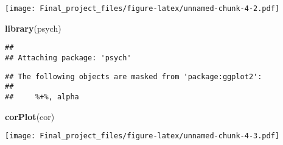 \documentclass[
]{article}
\newenvironment{Shaded}{\begin{snugshade}}{\end{snugshade}}
\newcommand{\CommentTok}[1]{\textcolor[rgb]{0.56,0.35,0.01}{\textit{#1}}}
\newcommand{\FunctionTok}[1]{\textcolor[rgb]{0.13,0.29,0.53}{\textbf{#1}}}
\newcommand{\NormalTok}[1]{#1}
\newcommand{\OtherTok}[1]{\textcolor[rgb]{0.56,0.35,0.01}{#1}}
\newcommand{\SpecialCharTok}[1]{\textcolor[rgb]{0.81,0.36,0.00}{\textbf{#1}}}
\begin{document}
\begin{Shaded}
\end{Shaded}

\texttt{[image: Final\_project\_files/figure-latex/unnamed-chunk-4-2.pdf]}

\begin{Shaded}
\begin{Highlighting}[]
\FunctionTok{library}\NormalTok{(psych)}
\end{Highlighting}
\end{Shaded}

\begin{verbatim}
## 
## Attaching package: 'psych'
\end{verbatim}

\begin{verbatim}
## The following objects are masked from 'package:ggplot2':
## 
##     %+%, alpha
\end{verbatim}

\begin{Shaded}
\begin{Highlighting}[]
\FunctionTok{corPlot}\NormalTok{(cor)}
\end{Highlighting}
\end{Shaded}

\texttt{[image: Final\_project\_files/figure-latex/unnamed-chunk-4-3.pdf]}
\end{document}
